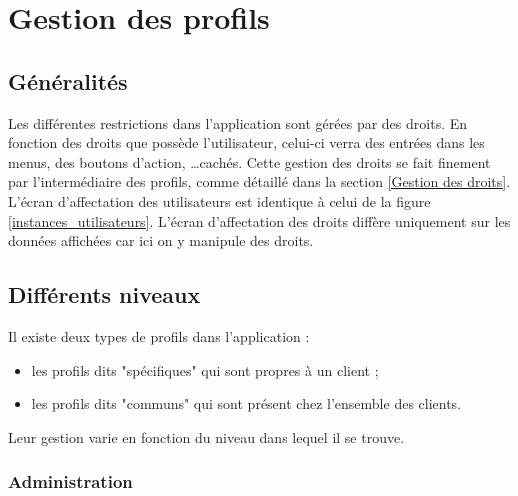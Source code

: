 \section{Gestion des profils}


\subsection{Généralités}

Les différentes restrictions dans l'application sont gérées par des droits.
En fonction des droits que possède l'utilisateur, celui-ci verra des entrées dans les menus, des boutons d'action, \ldots cachés.
Cette gestion des droits se fait finement par l'intermédiaire des profils, comme détaillé dans la section \ref{Gestion des droits}.
\\

L'écran d'affectation des utilisateurs est identique à celui de la figure \ref{instances_utilisateurs}.
L'écran d'affectation des droits diffère uniquement sur les données affichées car ici on y manipule des droits.


\subsection{Différents niveaux}

Il existe deux types de profils dans l'application :
\begin{itemize}
	\item les profils dits "spécifiques" qui sont propres à un client ;
	\item les profils dits "communs" qui sont présent chez l'ensemble des clients.
\end{itemize}
Leur gestion varie en fonction du niveau dans lequel il se trouve.


\subsubsection{Administration}
\label{IN_GestionDesProfils_DifférentsNiveaux_Administration}

